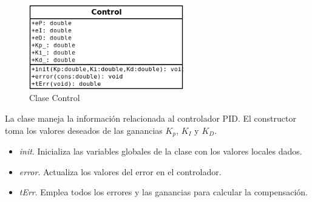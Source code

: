 \begin{figure}[htbp!]
	\centering
	\includegraphics[width=0.6\textwidth]{./Figuras/controlClass}
	\caption{Clase Control}
	\label{fig:controlC}
\end{figure}
\par La clase maneja la información relacionada al controlador PID. El constructor toma los valores deseados de las ganancias $K_{p}$, $K_{I}$ y $K_{D}$.
\begin{itemize}
	\item {\it init}. Inicializa las variables globales de la clase con los valores locales dados.
	\item {\it error}. Actualiza los valores del error en el controlador.
	\item {\it tErr}. Emplea todos los errores y las ganancias para calcular la compensación.
\end{itemize}